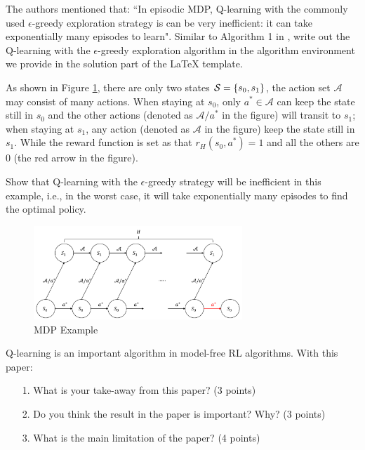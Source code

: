 \begin{questions}
\question[2]
The authors mentioned that: ``In episodic MDP, Q-learning with the commonly used $\epsilon$-greedy exploration strategy is can be very inefficient: it can take exponentially many episodes to learn". Similar to Algorithm 1 in \cite{jin2018q}, write out the Q-learning with the $\epsilon$-greedy exploration algorithm in the algorithm environment we provide in the solution part of the {\LaTeX} template.

\question[8]
As shown in Figure \ref{fig:eps-greedy-exp}, there are only two states $ \mathcal{S}={\left\{s_0, s_1\right\}} $, the action set $ \mathcal{A} $ may consist of many actions. When staying at $ s_0 $, only $ a^*\in\mathcal{A} $ can keep the state still in $ s_0 $ and the other actions (denoted as $ \mathcal{A}/a^* $ in the figure) will transit to $ s_1 $; when staying at $ s_1 $, any action (denoted as $ \mathcal{A} $ in the figure) keep the state still in $ s_1 $. While the reward function is set as that $ r_H(s_0, a^*)=1 $ and all the others are $ 0 $ (the red arrow in the figure).
    
Show that Q-learning with the $\epsilon$-greedy strategy will be inefficient in this example, i.e., in the worst case, it will take exponentially many episodes to find the optimal policy.
\begin{figure}[htbp]
	\centering
	\includegraphics[width=0.7\textwidth]{figs/e-greedy-exp.pdf} 
	\caption{MDP Example}
	\label{fig:eps-greedy-exp}
\end{figure}

\question[10] 
Q-learning is an important algorithm in model-free RL algorithms. With this paper:
\begin{itemize}
    \item[1.] What is your take-away from this paper? (3 points)
    \item[2.] Do you think the result in the paper is important? Why? (3 points)
    \item[3.] What is the main limitation of the paper? (4 points)
\end{itemize}

\end{questions}

